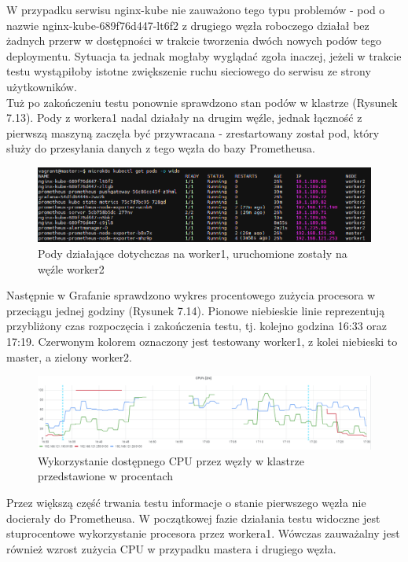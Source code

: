 W przypadku serwisu nginx-kube nie zauważono tego typu problemów - pod o nazwie nginx-kube-689f76d447-lt6f2 z drugiego węzła roboczego działał bez żadnych przerw w dostępności w trakcie tworzenia dwóch nowych podów tego deploymentu. Sytuacja ta jednak mogłaby wyglądać zgoła inaczej, jeżeli w trakcie testu wystąpiłoby istotne zwiększenie ruchu sieciowego do serwisu ze strony użytkowników.\\

Tuż po zakończeniu testu ponownie sprawdzono stan podów w klastrze (Rysunek 7.13). Pody z workera1 nadal działały na drugim węźle, jednak łączność z pierwszą maszyną zaczęła być przywracana - zrestartowany został pod, który służy do przesyłania danych z tego węzła do bazy Prometheusa.

\begin{figure}[H]
    \centering
    \includegraphics[width=1\textwidth]{img2/test2/pods2.png}
    \caption{Pody działające dotychczas na worker1, uruchomione zostały na węźle worker2}
\end{figure}

Następnie w Grafanie sprawdzono wykres procentowego zużycia procesora w przeciągu jednej godziny (Rysunek 7.14). Pionowe niebieskie linie reprezentują przybliżony czas rozpoczęcia i zakończenia testu, tj. kolejno godzina 16:33 oraz 17:19. 
Czerwonym kolorem oznaczony jest testowany worker1, z kolei niebieski to master, a zielony worker2.

\begin{figure}[H]
    \centering
    \includegraphics[width=1\textwidth]{img2/test2/cpu-stress.png}
    \caption{Wykorzystanie dostępnego CPU przez węzły w klastrze przedstawione w procentach}
\end{figure}

Przez większą część trwania testu informacje o stanie pierwszego węzła nie docierały do Prometheusa. W początkowej fazie działania testu widoczne jest stuprocentowe wykorzystanie procesora przez workera1. Wówczas zauważalny jest również wzrost zużycia CPU w przypadku mastera i drugiego węzła. \\

